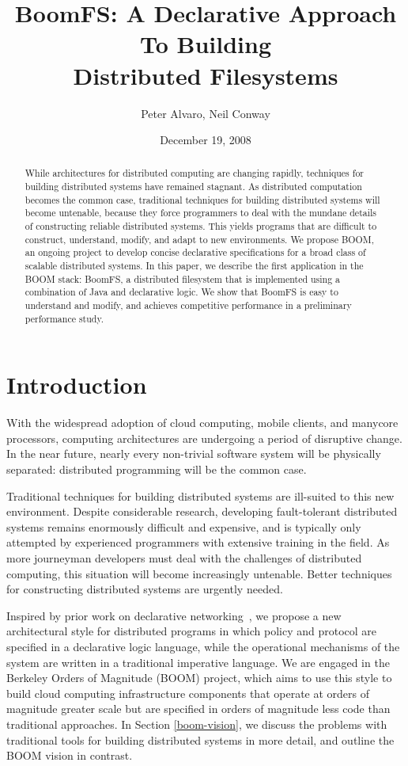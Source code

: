 \documentclass{article}
\title{BoomFS: A Declarative Approach To Building\\Distributed Filesystems}
\author{Peter Alvaro, Neil Conway}
\date{December 19, 2008}
\begin{document}
\maketitle
\begin{abstract}
  While architectures for distributed computing are changing rapidly,
  techniques for building distributed systems have remained
  stagnant. As distributed computation becomes the common case,
  traditional techniques for building distributed systems will become
  untenable, because they force programmers to deal with the mundane
  details of constructing reliable distributed systems. This yields
  programs that are difficult to construct, understand, modify, and
  adapt to new environments. We propose BOOM, an ongoing project to
  develop concise declarative specifications for a broad class of
  scalable distributed systems. In this paper, we describe the first
  application in the BOOM stack: BoomFS, a distributed filesystem that
  is implemented using a combination of Java and declarative logic. We
  show that BoomFS is easy to understand and modify, and achieves
  competitive performance in a preliminary performance study.
\end{abstract}
\section{Introduction}
\label{introduction}
With the widespread adoption of cloud computing, mobile clients, and
manycore processors, computing architectures are undergoing a period
of disruptive change. In the near future, nearly every non-trivial
software system will be physically separated: distributed programming
will be the common case.

Traditional techniques for building distributed systems are ill-suited
to this new environment. Despite considerable research, developing
fault-tolerant distributed systems remains enormously difficult and
expensive, and is typically only attempted by experienced programmers
with extensive training in the field. As more journeyman developers
must deal with the challenges of distributed computing, this situation
will become increasingly untenable. Better techniques for constructing
distributed systems are urgently needed.

Inspired by prior work on declarative networking~\cite{dn-sigmod,
  network-data-indep}, we propose a new architectural style for
distributed programs in which policy and protocol are specified in a
declarative logic language, while the operational mechanisms of the
system are written in a traditional imperative language. We are
engaged in the Berkeley Orders of Magnitude (BOOM) project, which aims
to use this style to build cloud computing infrastructure components
that operate at orders of magnitude greater scale but are specified in
orders of magnitude less code than traditional approaches. In Section
\ref{boom-vision}, we discuss the problems with traditional tools for
building distributed systems in more detail, and outline the BOOM
vision in contrast.
\end{document}
